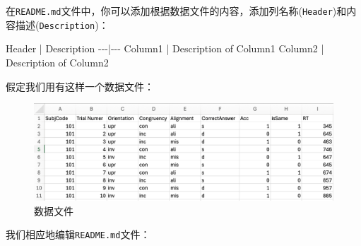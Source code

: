 \documentclass[]{ctexbook}
\newenvironment{Shaded}{\begin{snugshade}}{\end{snugshade}}
\newcommand{\NormalTok}[1]{#1}
\theoremstyle{definition}
\theoremstyle{definition}
\theoremstyle{definition}
\theoremstyle{definition}
\theoremstyle{remark}
\begin{document}
在\texttt{README.md}文件中，你可以添加根据数据文件的内容，添加列名称(\texttt{Header})和内容描述(\texttt{Description})：

\begin{Shaded}
\begin{Highlighting}[]

\NormalTok{Header | Description}
\NormalTok{{-}{-}{-}|{-}{-}{-}}
\NormalTok{Column1 | Description of Column1}
\NormalTok{Column2 | Description of Column2}
\end{Highlighting}
\end{Shaded}

假定我们用有这样一个数据文件：

\begin{figure}

{\centering \includegraphics[width=1\linewidth]{img/vscode/mkreadme_datafile} 

}

\caption{数据文件}\label{fig:mkreadme-datafile}
\end{figure}

我们相应地编辑\texttt{README.md}文件：
\end{document}
